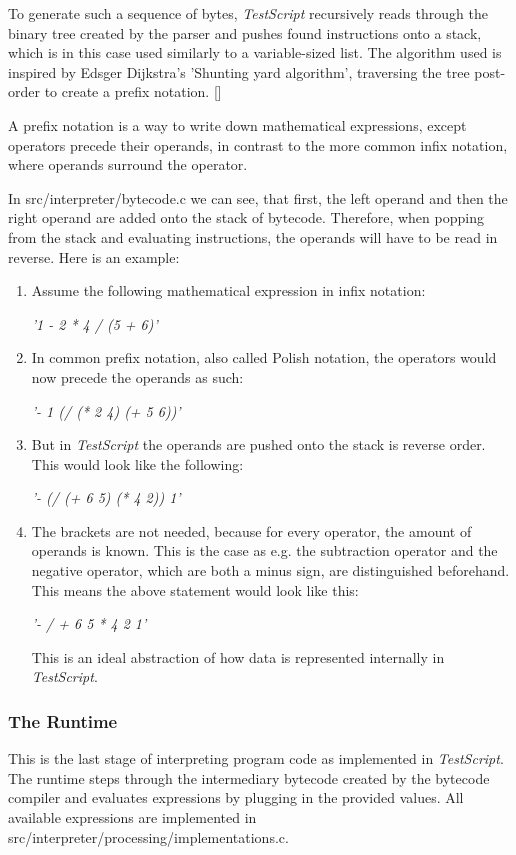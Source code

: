 \documentclass[12pt,a4paper]{article}
\newcommand{\expr}[1] {
    \begin{center}
        #1
    \end{center}
}
\newcommand{\name}{\emph{TestScript}}
\begin{document}
To generate such a sequence of bytes, \name{} recursively reads through the
binary tree created by the parser and pushes found instructions onto a stack,
which is in this case used similarly to a variable-sized list.
The algorithm used is inspired by Edsger Dijkstra's 'Shunting yard 
algorithm', traversing the tree post-order to create
a prefix notation. 
[]

A prefix notation is a way to write down mathematical expressions, except
operators precede their operands, in contrast to the more common infix notation,
where operands surround the operator.

In src/interpreter/bytecode.c we can see, that first, the left operand and then
the right operand are added onto the stack of bytecode. Therefore, when
popping from the stack and evaluating instructions, the operands will have to
be read in reverse.
Here is an example:
\begin{enumerate}
    \item Assume the following mathematical expression in infix notation:
        \expr{\emph{'1 - 2 * 4 / (5 + 6)'}}
    \item In common prefix notation, also called Polish notation, the
        operators would now precede the operands as such:
        \expr{\emph{'- 1 (/ (* 2 4) (+ 5 6))'}}
    \item But in \name{} the operands are pushed onto the stack is reverse order.
        This would look like the following:
        \expr{\emph{'- (/ (+ 6 5) (* 4 2)) 1'}}
    \item The brackets are not needed, because for every operator, the amount
        of operands is known. This is the case as e.g. the subtraction operator
        and the negative operator, which are both a minus sign, are distinguished
        beforehand. This means the above statement would look like this:
        \expr{\emph{'- / + 6 5 * 4 2 1'}}
        This is an ideal abstraction of how data 
        is represented internally in \name{}.
\end{enumerate}

\subsubsection{The Runtime}
This is the last stage of interpreting program code as implemented in \name{}.
The runtime steps through the intermediary bytecode created by the bytecode
compiler and evaluates expressions by plugging in the provided values.
All available expressions are implemented in 
src/interpreter/processing/implementations.c.
\end{document}
